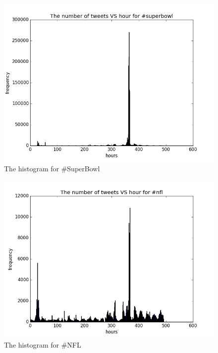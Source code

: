 \documentclass{article}
\begin{document}
\begin{figure}[htbp]
\centering
\includegraphics[width=.6\textwidth]{sp_hist.png}
\caption{The histogram for \#SuperBowl}
\label{fig:sp_hist}
\end{figure}
\begin{figure}[htbp]
\centering
\includegraphics[width=.6\textwidth]{nfl_hist.png}
\caption{The histogram for \#NFL}
\label{fig:nfl_hist}
\end{figure}
\end{document}
